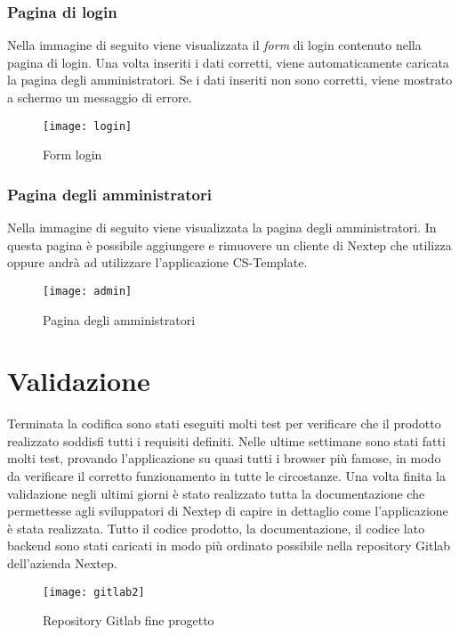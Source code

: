 \subsubsection{Pagina di login}
Nella immagine di seguito viene visualizzata il \emph{form} di login contenuto nella pagina di login. Una volta inseriti i dati corretti, viene automaticamente caricata la pagina degli amministratori. Se i dati inseriti non sono corretti, viene mostrato a schermo un messaggio di errore.
\begin{figure}[!h] 
	\centering 
	\texttt{[image: login]} 
	\caption{Form login }
\end{figure}
\subsubsection{Pagina degli amministratori}
Nella immagine di seguito viene visualizzata la pagina degli amministratori. In questa pagina è possibile aggiungere e rimuovere un cliente di Nextep che utilizza oppure andrà ad utilizzare l'applicazione CS-Template.
\begin{figure}[!h] 
	\centering 
	\texttt{[image: admin]} 
	\caption{Pagina degli amministratori }
\end{figure}

\section{Validazione} 
Terminata la codifica sono stati eseguiti molti test per verificare che il prodotto realizzato soddisfi tutti i requisiti definiti. Nelle ultime settimane sono stati fatti molti test, provando l'applicazione su quasi tutti i browser più famose, in modo da verificare il corretto funzionamento in tutte le circostanze. Una volta finita la validazione negli ultimi giorni è stato realizzato tutta la documentazione che permettesse agli sviluppatori di Nextep di capire in dettaglio come l'applicazione è stata realizzata. Tutto il codice prodotto, la documentazione, il codice lato backend sono stati caricati in modo più ordinato possibile nella repository Gitlab dell'azienda Nextep.

\begin{figure}[!h] 
	\centering 
	\texttt{[image: gitlab2]} 
	\caption{Repository Gitlab fine progetto }
\end{figure} 